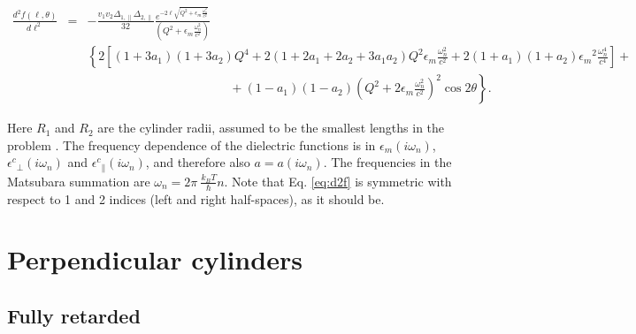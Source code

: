 \documentclass[onecolumn,letterpaper,amsmath,amssymb,floatfix,aps,superscriptaddress]{revtex4}
\begin{document}
\begin{widetext}
\begin{eqnarray}
\frac{d^{2}f(\ell,\theta)}{d\ell^{2}} &=& - \frac{v_1 v_2 \Delta_{1,\parallel} \Delta_{2,\parallel}}{32} 
\frac{e^{-2 \ell \sqrt{Q^{2} + \epsilon_m \frac{\omega_n^{2}}{c^{2}}}}}{(Q^{2} + \epsilon_m \frac{\omega_n^{2}}{c^{2}})} \nonumber \\
& &
\left\{ 2 \left[ (1+3a_1)(1+3a_2) Q^{4} + 2 (1+2a_1+2a_2+3a_1a_2) Q^{2} \epsilon_m \frac{\omega_n^{2}}{c^{2}} + 2(1+a_1)(1+a_2) {\epsilon_m}^{2} \frac{\omega_n^{4}}{c^{4}}\right] \right. + \nonumber\\
& & \left. ~~~~~~~~~~~~~~~~~~~~~~~~~~~~~~~~~~~~~~~~~~~~~~~~~~~~ + (1-a_1)(1-a_2)\left( Q^{2} + 2 \epsilon_m \frac{\omega_n^{2}}{c^{2}} \right)^2 \cos 2\theta \right \}.
\label{eq:d2f}
\end{eqnarray}
\end{widetext}
Here $R_1$ and $R_2$ are the cylinder radii, assumed to be the smallest lengths in the problem \cite{Barash89}. The frequency dependence of the dielectric functions is in 
$\epsilon_m(i \omega_n)$, ${\epsilon^{c}}_{\perp}(i \omega_n)$ and ${\epsilon^{c}}_{\parallel}(i \omega_n)$, and therefore also $a = a(i \omega_n)$. The frequencies 
in the Matsubara summation are $\omega_n = 2\pi~\frac{k_BT}{\hbar} n$. Note that Eq. \ref{eq:d2f} is symmetric with respect to 1 and 2 indices (left and right 
half-spaces), as it should be.

\section{Perpendicular cylinders}

\subsection{Fully retarded}
\end{document}
